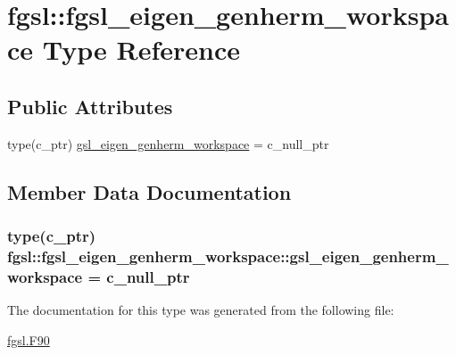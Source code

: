 \hypertarget{structfgsl_1_1fgsl__eigen__genherm__workspace}{}\section{fgsl\+:\+:fgsl\+\_\+eigen\+\_\+genherm\+\_\+workspace Type Reference}
\label{structfgsl_1_1fgsl__eigen__genherm__workspace}
\subsection*{Public Attributes}
\begin{DoxyCompactItemize}
\item 
type(c\+\_\+ptr) \hyperlink{structfgsl_1_1fgsl__eigen__genherm__workspace_aec60111a47f5aa75025ed6cc45a24f3c}{gsl\+\_\+eigen\+\_\+genherm\+\_\+workspace} = c\+\_\+null\+\_\+ptr
\end{DoxyCompactItemize}


\subsection{Member Data Documentation}
\hypertarget{structfgsl_1_1fgsl__eigen__genherm__workspace_aec60111a47f5aa75025ed6cc45a24f3c}{}
\subsubsection[{gsl\+\_\+eigen\+\_\+genherm\+\_\+workspace}]{\setlength{\rightskip}{0pt plus 5cm}type(c\+\_\+ptr) fgsl\+::fgsl\+\_\+eigen\+\_\+genherm\+\_\+workspace\+::gsl\+\_\+eigen\+\_\+genherm\+\_\+workspace = c\+\_\+null\+\_\+ptr}\label{structfgsl_1_1fgsl__eigen__genherm__workspace_aec60111a47f5aa75025ed6cc45a24f3c}


The documentation for this type was generated from the following file\+:\begin{DoxyCompactItemize}
\item 
\hyperlink{fgsl_8F90}{fgsl.\+F90}\end{DoxyCompactItemize}
